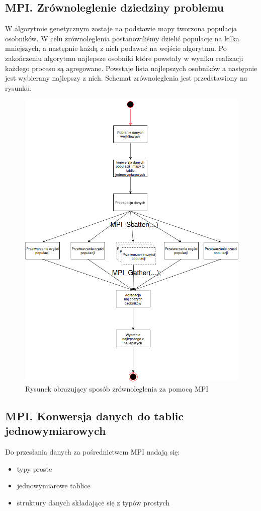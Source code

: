 \documentclass[10pt,a4paper]{article}
\begin{document}
\subsection{MPI. Zrównoleglenie dziedziny problemu}
W algorytmie genetycznym zostaje na podstawie mapy tworzona populacja osobników. W celu zrównoleglenia postanowiliśmy dzielić populacje na kilka mniejszych, a następnie każdą z nich podawać na wejście algorytmu. Po zakończeniu algorytmu najlepsze osobniki które powstały w wyniku realizacji każdego procesu są agregowane. Powstaje lista najlepszych osobników a następnie jest wybierany najlepszy z nich. Schemat zrównoleglenia jest przedstawiony na rysunku.

\begin{figure}[H]
\includegraphics[scale=0.5]{mpi_flow.png}
\centering
\caption{\label{fig:flowMpi}Rysunek obrazujący sposób zrównoleglenia za pomocą MPI}
\end{figure}

\subsection{MPI. Konwersja danych do tablic jednowymiarowych}
Do przesłania danych za pośrednictwem MPI nadają się:
\begin{itemize}
\item typy proste
\item jednowymiarowe tablice
\item struktury danych składające się z typów prostych
\end{itemize}
\end{document}
